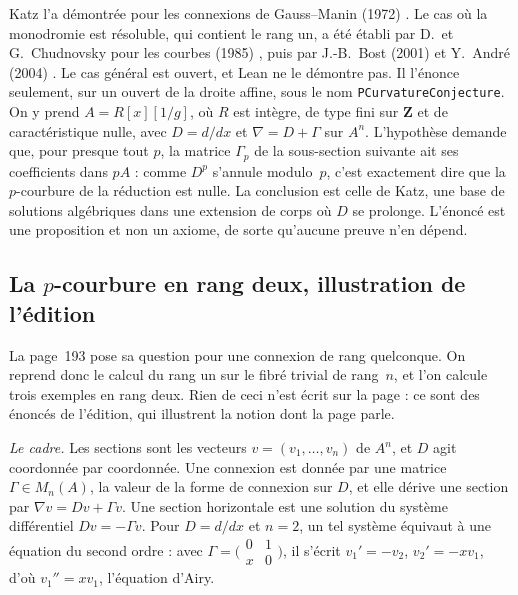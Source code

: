Katz l'a démontrée pour les connexions de Gauss--Manin (1972) \cite{katz1972}. Le cas où la monodromie est résoluble, qui contient le rang un, a été établi par D.~et G.~Chudnovsky pour les courbes (1985) \cite{chudnovsky1985}, puis par J.-B.~Bost (2001) \cite{bost2001} et Y.~André (2004) \cite{andre2004}. Le cas général est ouvert, et Lean ne le démontre pas. Il l'énonce seulement, sur un ouvert de la droite affine, sous le nom \texttt{PCurvatureConjecture}. On y prend $A = R[x][1/g]$, où $R$ est intègre, de type fini sur $\mathbf Z$ et de caractéristique nulle, avec $D = d/dx$ et $\nabla = D + \Gamma$ sur $A^n$. L'hypothèse demande que, pour presque tout $p$, la matrice $\Gamma_p$ de la sous-section suivante ait ses coefficients dans $pA$ : comme $D^p$ s'annule modulo~$p$, c'est exactement dire que la $p$-courbure de la réduction est nulle. La conclusion est celle de Katz, une base de solutions algébriques dans une extension de corps où $D$ se prolonge. L'énoncé est une proposition et non un axiome, de sorte qu'aucune preuve n'en dépend.

\subsection*{La $p$-courbure en rang deux, illustration de l'édition}

La page~193 pose sa question pour une connexion de rang quelconque. On reprend donc le calcul du rang un sur le fibré trivial de rang~$n$, et l'on calcule trois exemples en rang deux. Rien de ceci n'est écrit sur la page : ce sont des énoncés de l'édition, qui illustrent la notion dont la page parle.

\noindent\emph{Le cadre.} Les sections sont les vecteurs $v = (v_1, \dots, v_n)$ de $A^n$, et $D$ agit coordonnée par coordonnée. Une connexion est donnée par une matrice $\Gamma \in M_n(A)$, la valeur de la forme de connexion sur $D$, et elle dérive une section par $\nabla v = Dv + \Gamma v$. Une section horizontale est une solution du système différentiel $Dv = -\Gamma v$. Pour $D = d/dx$ et $n = 2$, un tel système équivaut à une équation du second ordre : avec $\Gamma = \bigl(\begin{smallmatrix} 0 & 1 \\ x & 0 \end{smallmatrix}\bigr)$, il s'écrit $v_1' = -v_2$, $v_2' = -x v_1$, d'où $v_1'' = x v_1$, l'équation d'Airy.

